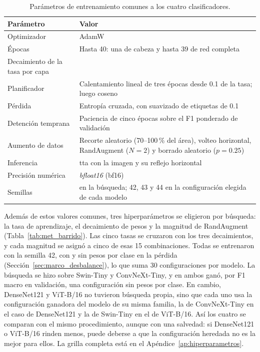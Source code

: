 \begin{table}[H]
    \centering
    \caption{Parámetros de entrenamiento comunes a los cuatro clasificadores.}
    \label{tab:met_receta}
    \small
    \begin{tabularx}{\textwidth}{@{}>{\raggedright\arraybackslash}p{4.2cm}>{\raggedright\arraybackslash}X@{}}
        \toprule
        \textbf{Parámetro} & \textbf{Valor} \\
        \midrule
        Optimizador & AdamW \\
        \filasep
        Épocas & Hasta 40: una de cabeza y hasta 39 de red completa \\
        \filasep
        Decaimiento de la tasa por capa & 0.85 \\
        \filasep
        Planificador & Calentamiento lineal de tres épocas desde 0.1 de la tasa; luego coseno \\
        \filasep
        Pérdida & Entropía cruzada, con suavizado de etiquetas de 0.1 \\
        \filasep
        Detención temprana & Paciencia de cinco épocas sobre el F1 ponderado de validación \\
        \filasep
        Aumento de datos & Recorte aleatorio (70--100\,\% del área), volteo horizontal, RandAugment ($N = 2$) y borrado aleatorio ($p = 0.25$) \\
        \filasep
        Inferencia & \gls{tta} con la imagen y su reflejo horizontal \\
        \filasep
        Precisión numérica & \emph{bfloat16} (bf16) \\
        \filasep
        Semillas & 42 en la búsqueda; 42, 43 y 44 en la configuración elegida de cada modelo \\
        \bottomrule
    \end{tabularx}
\end{table}

Además de estos valores comunes, tres hiperparámetros se eligieron por búsqueda: la tasa de aprendizaje, el decaimiento
de pesos y la magnitud de RandAugment (Tabla~\ref{tab:met_barrido}). Las cinco tasas se cruzaron con los tres decaimientos, y cada magnitud se
asignó a cinco de esas 15 combinaciones. Todas se entrenaron con la semilla 42, con y sin pesos por clase en la
pérdida (Sección~\ref{sec:marco_desbalance}), lo que suma 30 configuraciones por modelo. La
búsqueda se hizo sobre Swin-Tiny y ConvNeXt-Tiny, y en ambos ganó, por F1 macro en validación, una configuración sin
pesos por clase. En cambio, DenseNet121 y ViT-B/16 no tuvieron búsqueda propia, sino que cada uno usa la configuración
ganadora del modelo de su misma familia, la de ConvNeXt-Tiny en el caso de DenseNet121 y la de Swin-Tiny en el de ViT-B/16. Así los cuatro
se comparan con el mismo procedimiento, aunque con una salvedad: si DenseNet121 o ViT-B/16 rinden menos, puede deberse a
que la configuración heredada no es la mejor para ellos. La grilla completa está en el Apéndice~\ref{ap:hiperparametros}.

